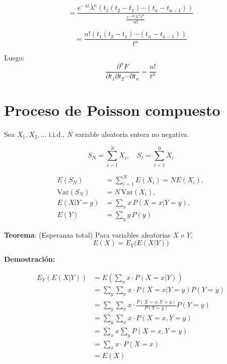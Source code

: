 \documentclass[12pt,a4paper]{article}
\newcommand{\teorema}[1]{%
\begin{teoremabox}
\textbf{Teorema}: #1
\end{teoremabox}
}
\begin{document}
\begin{equation*}
= \frac{e^{-\lambda t} \lambda^n (t_1(t_2-t_1)\cdots(t_n-t_{n-1}))}{\frac{e^{-\lambda t} \lambda^n t^n}{n!}}
\end{equation*}

\begin{equation*}
= \frac{n! (t_1(t_2-t_1)\cdots(t_n-t_{n-1}))}{t^n}
\end{equation*}

Luego:
\begin{equation*}
\frac{\partial^n F}{\partial t_1 \partial t_2 \cdots \partial t_n} = \frac{n!}{t^n}
\end{equation*}





\section{Proceso de Poisson compuesto}

Sea $X_1, X_2, \ldots$ i.i.d., $N$ variable aleatoria entera no negativa.

\begin{equation*}
  S_N = \sum_{i=1}^{N} X_i, \quad S_t = \sum_{i=1}^{0} X_i
\end{equation*}

\begin{align*}
E(S_N) &= \sum_{i=1}^{N} E(X_i) = N E(X_i), \\
\mathrm{Var}(S_N) &= N\, \mathrm{Var}(X_i), \\
E(X|Y=y) &= \sum_{x} x\, P(X=x|Y=y), \\
E(Y) &= \sum_{y} y\, P(y)
\end{align*}


\teorema{(Esperanza total) Para variables aleatorias $X$ e $Y$,
\begin{equation*}
E(X) = E_Y\big(E(X|Y)\big)
\end{equation*}
}

\textbf{Demostración:}

\begin{align*}
E_Y(E(X|Y)) &= E\left(\sum_x x \cdot P(X=x|Y)\right) \\
&= \sum_y \sum_x x \cdot P(X=x|Y=y) P(Y=y) \\
&= \sum_y \sum_x x \cdot \frac{P(X=x, Y=y)}{P(Y=y)} P(Y=y) \\
&= \sum_y \sum_x x \cdot P(X=x, Y=y) \\
&= \sum_x x \sum_y P(X=x, Y=y) \\
&= \sum_x x \cdot P(X=x) \\
&= E(X)
\end{align*}
\end{document}
